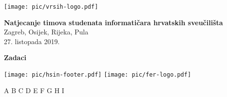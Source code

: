 \documentclass[a4paper]{article}
\begin{document}
\thispagestyle{empty}
\begin{center}
  \texttt{[image: pic/vrsih-logo.pdf]}
\end{center}
\vspace{1cm}
\begin{center}
  {\Large\textbf{\textsf{Natjecanje timova studenata informatičara hrvatskih sveučilišta}}} \\
  \vspace{.5cm}
  {\large{\textsf{Zagreb, Osijek, Rijeka, Pula}}} \\
  \vspace{.3cm}
  \textsf{27. listopada 2019.}
\end{center}
\vspace{2cm}
\begin{center}
  {\large \textbf{Zadaci}}
  
  \begin{minipage}{.5\textwidth}
    \renewcommand\contentsname{}
    \tableofcontents
  \end{minipage}
\end{center}
\vspace{5cm}
\begin{center}
  \texttt{[image: pic/hsin-footer.pdf]}
  \hspace{3cm}
  \texttt{[image: pic/fer-logo.pdf]}
\end{center}
\vspace{\fill}
\clearpage
\setcounter{page}{1}
{A}
{B}
{C}
{D}
{E}
{F}
{G}
{H}
{I}
\end{document}
